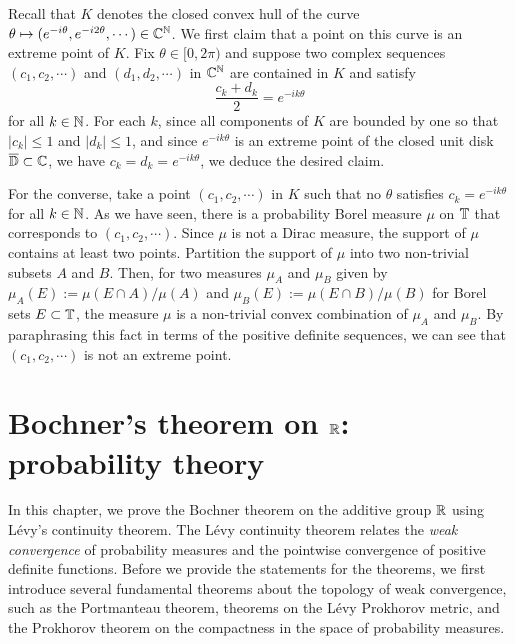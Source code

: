\documentclass{../../small}
\begin{document}
\begin{pf}
Recall that $K$ denotes the closed convex hull of the curve $\theta\mapsto(e^{-i\theta},e^{-i2\theta},\cdots)\in\mathbb{C}^{\mathbb{N}}$.
We first claim that a point on this curve is an extreme point of $K$.
Fix $\theta\in[0,2\pi)$ and suppose two complex sequences $(c_1,c_2,\cdots)$ and $(d_1,d_2,\cdots)$ in $\mathbb{C}^{\mathbb{N}}$ are contained in $K$ and satisfy
\[\frac{c_k+d_k}2=e^{-ik\theta}\]
for all $k\in\mathbb{N}$.
For each $k$, since all components of $K$ are bounded by one so that $|c_k|\le1$ and $|d_k|\le1$, and since $e^{-ik\theta}$ is an extreme point of the closed unit disk $\overline{\mathbb{D}}\subset\mathbb{C}$, we have $c_k=d_k=e^{-ik\theta}$, we deduce the desired claim.

For the converse, take a point $(c_1,c_2,\cdots)$ in $K$ such that no $\theta$ satisfies $c_k=e^{-ik\theta}$ for all $k\in\mathbb{N}$.
As we have seen, there is a probability Borel measure $\mu$ on $\mathbb{T}$ that corresponds to $(c_1,c_2,\cdots)$.
Since $\mu$ is not a Dirac measure, the support of $\mu$ contains at least two points.
Partition the support of $\mu$ into two non-trivial subsets $A$ and $B$.
Then, for two measures $\mu_A$ and $\mu_B$ given by $\mu_A(E):=\mu(E\cap A)/\mu(A)$ and $\mu_B(E):=\mu(E\cap B)/\mu(B)$ for Borel sets $E\subset\mathbb{T}$, the measure $\mu$ is a non-trivial convex combination of $\mu_A$ and $\mu_B$.
By paraphrasing this fact in terms of the positive definite sequences, we can see that $(c_1,c_2,\cdots)$ is not an extreme point.
\end{pf}















\newpage
\section{Bochner's theorem on $\mathbb{R}$: probability theory}

In this chapter, we prove the Bochner theorem on the additive group $\mathbb{R}$ using L\'evy's continuity theorem.
The L\'evy continuity theorem relates the \emph{weak convergence} of probability measures and the pointwise convergence of positive definite functions.
Before we provide the statements for the theorems, we first introduce several fundamental theorems about the topology of weak convergence, such as the Portmanteau theorem, theorems on the L\'evy Prokhorov metric, and the Prokhorov theorem on the compactness in the space of probability measures.
\end{document}

